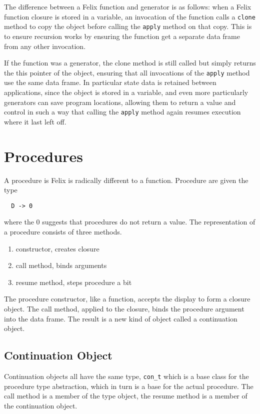 \documentclass[oneside]{book}
\begin{document}
The difference between a Felix function and generator is as follows:
when a Felix function closure is stored in a variable, an invocation of the function
calls a \verb$clone$ method to copy the object before calling the \verb$apply$ method
on that copy. This is to ensure recursion
works by ensuring the function get a separate data frame from any other
invocation.

If the function was a generator, the clone method is still called but simply
returns the this pointer of the object, ensuring that all invocations
of the \verb$apply$ method use the same data frame. In particular state
data is retained between applications, since the object is stored in a variable,
and even more particularly generators can save program locations, allowing them
to return a value and control in such a way that calling the \verb$apply$ method
again resumes execution where it last left off.


\section{Procedures}

A procedure is Felix is radically different to a function. Procedure are given the type

\begin{verbatim}
  D -> 0
\end{verbatim}

where the 0 suggests that procedures do not return a value. The representation of a procedure
consists of three methods.

\begin{enumerate}
\item constructor, creates closure
\item call method, binds arguments
\item resume method, steps procedure a bit
\end{enumerate}

The procedure constructor, like a function, accepts the display to form a closure object.
The call method, applied to the closure, binds the procedure argument into the data frame.
The result is a new kind of object called a continuation object.

\subsection{Continuation Object}
Continuation objects all have the same type, \verb$con_t$ which is a base class for
the procedure type abstraction, which in turn is a base for the actual procedure.
The call method is a member of the type object, the resume method is a member
of the continuation object.
\end{document}
